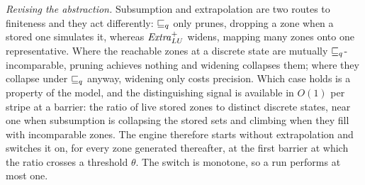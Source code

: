 \emph{Revising the abstraction.}  Subsumption and extrapolation are two routes to
finiteness and they act differently: $\sqsubseteq_q$ only prunes, dropping a zone when
a stored one simulates it, whereas $\mathit{Extra}^{+}_{LU}$ widens, mapping many zones onto one
representative.  Where the reachable zones at a discrete state are mutually
$\sqsubseteq_q$-incomparable, pruning achieves nothing and widening collapses them;
where they collapse under $\sqsubseteq_q$ anyway, widening only costs precision.  Which
case holds is a property of the model, and the distinguishing signal is available
in $O(1)$ per stripe at a barrier: the ratio of live stored zones to distinct
discrete states, near one when subsumption is collapsing the stored sets and
climbing when they fill with incomparable zones.  The engine therefore starts
without extrapolation and switches it on, for every zone generated thereafter, at
the first barrier at which the ratio crosses a threshold $\theta$.  The switch is
monotone, so a run performs at most one.
